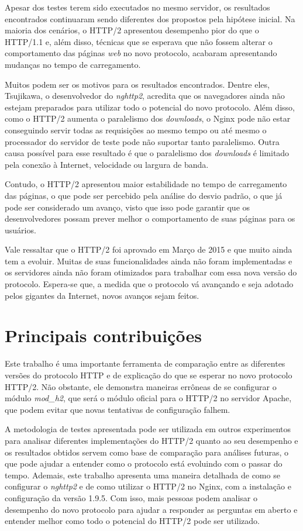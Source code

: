 Apesar dos testes terem sido executados no mesmo servidor, os resultados encontrados continuaram sendo diferentes dos propostos pela hipótese inicial. Na maioria dos cenários, o HTTP/2 apresentou desempenho pior do que o HTTP/1.1 e, além disso, técnicas que se esperava que não fossem alterar o comportamento das páginas \textit{web} no novo protocolo, acabaram apresentando mudanças no tempo de carregamento.

Muitos podem ser os motivos para os resultados encontrados. Dentre eles, Tsujikawa, o desenvolvedor do \textit{nghttp2}, acredita que os navegadores ainda não estejam preparados para utilizar todo o potencial do novo protocolo. Além disso, como o HTTP/2 aumenta o paralelismo dos \textit{downloads}, o Nginx pode não estar conseguindo servir todas as requisições ao mesmo tempo ou até mesmo o processador do servidor de teste pode não suportar tanto paralelismo. Outra causa possível para esse resultado é que o paralelismo dos \textit{downloads} é limitado pela conexão à Internet, velocidade ou largura de banda.

Contudo, o HTTP/2 apresentou maior estabilidade no tempo de carregamento das páginas, o que pode ser percebido pela análise do desvio padrão, o que já pode ser considerado um avanço, visto que isso pode garantir que os desenvolvedores possam prever melhor o comportamento de suas páginas para os usuários.

Vale ressaltar que o HTTP/2 foi aprovado em Março de 2015 e que muito ainda tem a evoluir. Muitas de suas funcionalidades ainda não foram implementadas e os servidores ainda não foram otimizados para trabalhar com essa nova versão do protocolo. Espera-se que, a medida que o protocolo vá avançando e seja adotado pelos gigantes da Internet, novos avanços sejam feitos.

\section{Principais contribuições}
\label{principaiscontribuicoes}

Este trabalho é uma importante ferramenta de comparação entre as diferentes versões do protocolo HTTP e de explicação do que se esperar no novo protocolo HTTP/2. Não obstante, ele demonstra maneiras errôneas de se configurar o módulo \textit{mod\_h2}, que será o módulo oficial para o HTTP/2 no servidor Apache, que podem evitar que novas tentativas de configuração falhem.

A metodologia de testes apresentada pode ser utilizada em outros experimentos para analisar diferentes implementações do HTTP/2 quanto ao seu desempenho e os resultados obtidos servem como base de comparação para análises futuras, o que pode ajudar a entender como o protocolo está evoluindo com o passar do tempo. Ademais, este trabalho apresenta uma maneira detalhada de como se configurar o \textit{nghttp2} e de como utilizar o HTTP/2 no Nginx, com a instalação e configuração da versão 1.9.5. Com isso, mais pessoas podem analisar o desempenho do novo protocolo para ajudar a responder as perguntas em aberto e entender melhor como todo o potencial do HTTP/2 pode ser utilizado.


